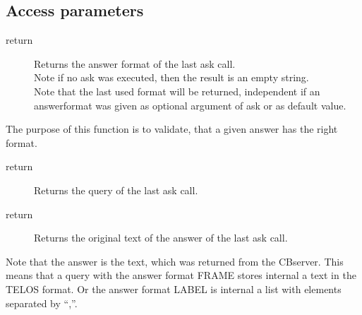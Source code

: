   \subsection{Access parameters}
	\begin{method}{ }
	  \begin{description}
	    \item[ return]
		Returns the answer format of the last ask call. \\
		Note if no ask was executed, 
		 then the result is an empty string. \\
		Note that the last used format will be returned, 
		 independent if an answerformat was given as optional
		 argument of ask or as default value.
	  \end{description}
	 The purpose of this function is to validate, 
	 that a given answer has the right format.
	\end{method}
	\begin{method}{ }
	  \begin{description}
	    \item[ return]
		Returns the query of the last ask call. 
	  \end{description}
	\end{method}
	\begin{method}{ }
	  \begin{description}
	    \item[ return]
		Returns the original text of the answer
		 of the last ask call. 
	  \end{description}
		Note that the answer is the text,
		 which was returned from the CBserver.
	 	This means that a query with the answer format FRAME
		 stores internal a text in the TELOS format. 
		Or the answer format LABEL is internal
		 a list with elements separated by ``,''.
	\end{method}
